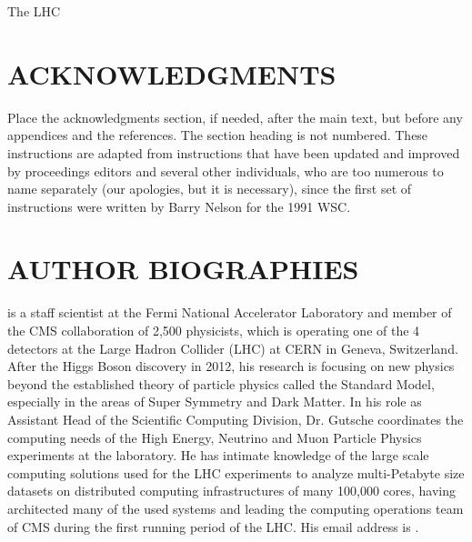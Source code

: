 \documentclass{wscpaperproc}
\theoremstyle{wsc}
\begin{document}
The LHC~\cite{1748-0221-3-08-S08001}

\section*{ACKNOWLEDGMENTS}
Place the acknowledgments section, if needed, after the main text, but before any appendices and the references. The section heading is not numbered.
These instructions are adapted from instructions that have been updated and improved by proceedings editors and several other individuals, who are too numerous to name separately (our apologies, but it is necessary), since the first set of instructions were written by Barry Nelson for the 1991 WSC.

\appendix





\section*{AUTHOR BIOGRAPHIES}

 is a staff scientist at the Fermi National Accelerator Laboratory and member of the CMS collaboration of 2,500 physicists, which is operating one of the 4 detectors at the Large Hadron Collider (LHC) at CERN in Geneva, Switzerland. After the Higgs Boson discovery in 2012, his research is focusing on new physics beyond the established theory of particle physics called the Standard Model, especially in the areas of Super Symmetry and Dark Matter. In his role as Assistant Head of the Scientific Computing Division, Dr. Gutsche coordinates the computing needs of the High Energy, Neutrino and Muon Particle Physics experiments at the laboratory. He has intimate knowledge of the large scale computing solutions used for the LHC experiments to analyze multi-Petabyte size datasets on distributed computing infrastructures of many 100,000 cores, having architected many of the used systems and leading the computing operations team of CMS during the first running period of the LHC. His email address is .\\
\end{document}
